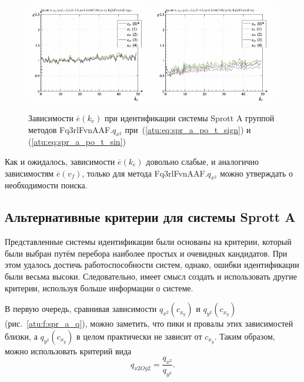 \begin{figure}[htb!]
  \centerline{
    \includegraphics[width=0.49\textwidth]{p/cha/spr_a/Fq3rlFvnAAF_x2/sprott_a_id-p_k_e_sign.png}
    \hfill
    \includegraphics[width=0.49\textwidth]{p/cha/spr_a/Fq3rlFvnAAF_x2/sprott_a_id-p_k_e_sin.png}
  }
  \caption{Зависимости $\overline{e}(k_e)$ при идентификации системы Sprott A группой методов Fq3rlFvnAAF.$q_{x^2}$
   при~(\ref{atu:eq:spr_a_po_t_sign}) и (\ref{atu:eq:spr_a_po_t_sin})}
  \label{atu:f:spr_a_k_e_Fq3rlFvnAAF_q_x2}
\end{figure}

Как и ожидалось, зависимости $\overline{e}(k_e)$
довольно слабые, и аналогично зависимостям  $\overline{e}(v_f)$,
только для метода Fq3rlFvnAAF.$q_{x^2}$ можно
утверждать о необходимости поиска.


\subsection{Альтернативные критерии для системы Sprott A}   %

Представленные системы идентификации были основаны на критерии,
который были выбран путём перебора наиболее простых и очевидных кандидатов.
При этом удалось достичь работоспособности систем,
однако, ошибки идентификации были весьма высоки.
Следовательно, имеет смысл создать и использовать другие критерии,
используя больше информации о системе.

В первую очередь, сравнивая зависимости $q_{x^2}(c_{x_y})$ и $q_{y^2}(c_{x_y})$
(рис.~\ref{atu:f:spr_a_q}), можно заметить, что
пики и провалы этих зависимостей близки, а  $q_{y^2}(c_{x_y})$
в целом практически не зависит от $c_{x_y}$.
Таким образом, можно использовать критерий вида
%
\[
  q_{x2Oy2} = \frac{q_{x^2}}{q_{y^2}}.
\]


